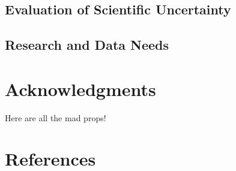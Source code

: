 \documentclass[11pt,
  english,
  letterpaper,
]{article}
\begin{document}
\hypertarget{evaluation-of-scientific-uncertainty}{%
\subsection{Evaluation of Scientific Uncertainty}\label{evaluation-of-scientific-uncertainty}}

\hypertarget{research-and-data-needs-1}{%
\subsection{Research and Data Needs}\label{research-and-data-needs-1}}

\hypertarget{acknowledgments}{%
\section{Acknowledgments}\label{acknowledgments}}

Here are all the mad props!

\clearpage

\hypertarget{references}{%
\section{References}\label{references}}
\end{document}

